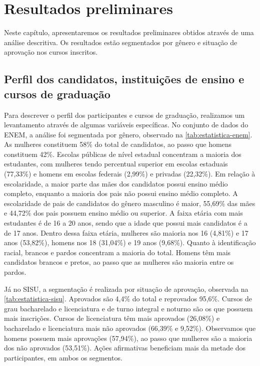 \chapter{Resultados preliminares}
\label{chap:resultados-preliminares}
Neste capítulo, apresentaremos os resultados preliminares obtidos através de uma análise descritiva. Os resultados estão segmentados por gênero e situação de aprovação nos cursos inscritos.

\section{Perfil dos candidatos, instituições de ensino e cursos de graduação}
Para descrever o perfil dos participantes e cursos de graduação, realizamos um levantamento através de algumas variáveis específicas. No conjunto de dados do ENEM, a análise foi segmentada por gênero, observado na \autoref{tab:estatistica-enem}. As mulheres constituem 58\% do total de candidatos, ao passo que homens constituem 42\%. Escolas públicas de nível estadual concentram a maioria dos estudantes, com mulheres tendo percentual superior em escolas estaduais (77,33\%) e homens em escolas federais (2,99\%) e privadas (22,32\%). Em relação à escolaridade, a maior parte das mães dos candidatos possui ensino médio completo, enquanto a maioria dos pais não possui ensino médio completo. A escolaridade de pais de candidatos do gênero masculino é maior, 55,69\% das mães e 44,72\% dos pais possuem ensino médio ou superior. A faixa etária com mais estudantes é de 16 a 20 anos, sendo que a idade que possui mais candidatos é a de 17 anos. Dentro dessa faixa etária, mulheres são maioria nos 16 (4,81\%) e 17 anos (53,82\%), homens nos 18 (31,04\%) e 19 anos (9,68\%). Quanto à identificação racial, brancos e pardos concentram a maioria do total. Homens têm mais candidatos brancos e pretos, ao passo que as mulheres são maioria entre os pardos. 

Já no SISU, a segmentação é realizada por situação de aprovação, observada na \autoref{tab:estatistica-sisu}. Aprovados são 4,4\% do total e reprovados 95,6\%. Cursos de grau bacharelado e licenciatura e de turno integral e noturno são os que possuem mais inscrições. Cursos de licenciatura têm mais aprovados (26,08\%) e bacharelado e licenciatura mais não aprovados (66,39\% e 9,52\%). Observamos que homens possuem mais aprovações (57,94\%), ao passo que mulheres são a maioria dos não aprovados (53,51\%). Ações afirmativas beneficiam mais da metade dos participantes, em ambos os segmentos.


